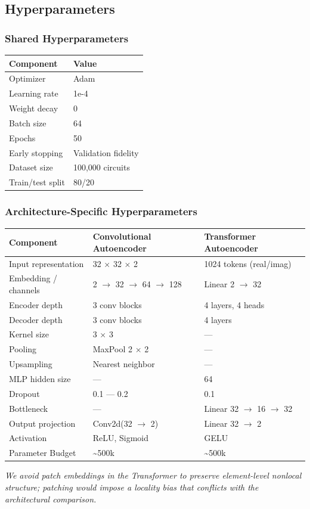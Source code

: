 \documentclass[11pt]{article}
\begin{document}
\subsection{Hyperparameters}
\label{sec:org2f0ab83}

\subsubsection{Shared Hyperparameters}
\label{sec:orga96ec63}

\begin{center}
\begin{tabular}{ll}
Component & Value\\
\hline
Optimizer & Adam\\
Learning rate & 1e-4\\
Weight decay & 0\\
Batch size & 64\\
Epochs & 50\\
Early stopping & Validation fidelity\\
Dataset size & 100,000 circuits\\
Train/test split & 80/20\\
\end{tabular}
\end{center}
\subsubsection{Architecture-Specific Hyperparameters}
\label{sec:orge2dcdd7}
\begin{center}
\begin{tabular}{lll}
Component & Convolutional Autoencoder & Transformer Autoencoder\\
\hline
Input representation & 32 \(\times\) 32 \(\times\) 2 & 1024 tokens (real/imag)\\
Embedding / channels & 2 \(\rightarrow\) 32 \(\rightarrow\) 64 \(\rightarrow\) 128 & Linear 2 \(\rightarrow\) 32\\
Encoder depth & 3 conv blocks & 4 layers, 4 heads\\
Decoder depth & 3 conv blocks & 4 layers\\
Kernel size & 3 \(\times\) 3 & —\\
Pooling & MaxPool 2 \(\times\) 2 & —\\
Upsampling & Nearest neighbor & —\\
MLP hidden size & — & 64\\
Dropout & 0.1 — 0.2 & 0.1\\
Bottleneck & — & Linear 32 \(\rightarrow\) 16 \(\rightarrow\) 32\\
Output projection & Conv2d(32 \(\rightarrow\) 2) & Linear 32 \(\rightarrow\) 2\\
Activation & ReLU, Sigmoid & GELU\\
Parameter Budget & \textasciitilde{}500k & \textasciitilde{}500k\\
\end{tabular}
\end{center}
\emph{We avoid patch embeddings in the Transformer to preserve element-level nonlocal structure; patching would impose a locality bias that conflicts with the architectural comparison.}
\end{document}
